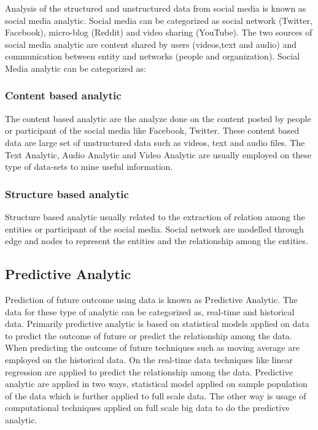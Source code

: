 \documentclass[sigconf]{acmart}
\begin{document}
Analysis of the structured and unstructured data from social media is known as social media analytic. Social media can be categorized as social network (Twitter, Facebook), micro-blog (Reddit) and video sharing (YouTube). The two sources of social media analytic are content shared by users (videos,text and audio) and communication between entity and networks (people and organization). Social Media analytic can be categorized as:

\subsubsection{Content based analytic\cite{bigdata}}
    
The content based analytic are the analyze done on the content posted by people or participant of the social media like Facebook, Twitter. These content based data are large set of unstructured data such as videos, text and audio files. The Text Analytic, Audio Analytic and Video Analytic are usually employed on these type of data-sets to mine useful information.
    
\subsubsection{Structure based analytic\cite{bigdata}}

Structure based analytic usually related to the extraction of relation among the entities or participant of the social media. Social network are modelled through edge and nodes to represent the entities and the relationship among the entities.



\subsection{Predictive Analytic}

Prediction of future outcome using data is known as Predictive Analytic. The data for these type of analytic can be categorized as, real-time and historical data. Primarily predictive analytic is based on statistical models applied on data to predict the outcome of future or predict the relationship among the data. When predicting the outcome of future techniques such as moving average are employed on the historical data. On the real-time data techniques like linear regression are applied to predict the relationship among the data. Predictive analytic are applied in two ways, statistical model applied on sample population of the data which is further applied to full scale data. The other way is usage of computational techniques applied on full scale big data to do the predictive analytic.  
 
\end{document}
